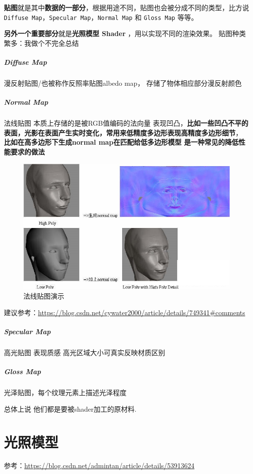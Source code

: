 \documentclass[UTF8,a4paper,12pt]{ctexbook}
\begin{document}
				\textbf{贴图}就是其中\textbf{数据的一部分}，根据用途不同，贴图也会被分成不同的类型，比方说 \verb|Diffuse Map|，\verb|Specular Map|，\verb|Normal Map| 和 \verb|Gloss Map| 等等。
				
				\textbf{另外一个重要部分}就是\textbf{光照模型 Shader} ，用以实现不同的渲染效果。 贴图种类繁多：我做个不完全总结
				
				\subparagraph{Diffuse Map}
					漫反射贴图/也被称作反照率贴图albedo map， 存储了物体相应部分漫反射颜色
					
				\subparagraph{Normal Map}
					法线贴图 本质上存储的是被RGB值编码的法向量 表现凹凸，\textbf{比如一些凹凸不平的表面，光影在表面产生实时变化，常用来低精度多边形表现高精度多边形细节}， \textbf{比如在高多边形下生成normal map在匹配给低多边形模型 是一种常见的降低性能要求的做法}
					
					\begin{figure}[H]
						\centering
						\includegraphics[scale=0.8]{normalMap}
						\caption{法线贴图演示}
					\end{figure}
					
					建议参考：\url{https://blog.csdn.net/cywater2000/article/details/749341#comments}
					
				\subparagraph{Specular Map}
					高光贴图 表现质感 高光区域大小可真实反映材质区别
					
				\subparagraph{Gloss Map}
					光泽贴图，每个纹理元素上描述光泽程度
					
			总体上说 他们都是要被shader加工的原材料.
	
	\section{光照模型}
		参考：\url{https://blog.csdn.net/admintan/article/details/53913624}
		
\end{document}
